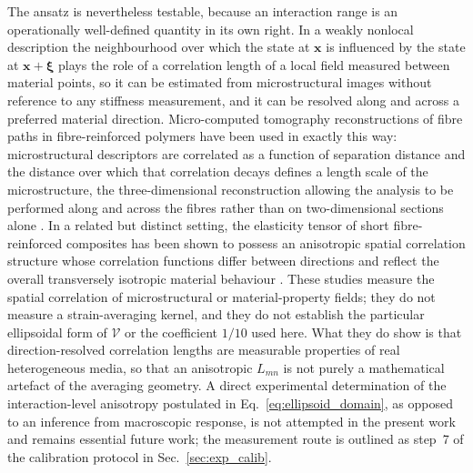 \documentclass[final,3p,times,fleqn]{elsarticle}
\newcommand{\revtwo}[1]{\textcolor{revtwocolor}{#1}}
\begin{document}
\revtwo{The ansatz is nevertheless testable, because an interaction
range is an operationally well-defined quantity in its own right. In a
weakly nonlocal description the neighbourhood over which the state at
$\mathbf{x}$ is influenced by the state at $\mathbf{x}+\boldsymbol{\xi}$
plays the role of a correlation length of a local field measured between
material points, so it can be estimated from microstructural images
without reference to any stiffness measurement, and it can be resolved
along and across a preferred material direction. Micro-computed
tomography reconstructions of fibre paths in fibre-reinforced polymers
have been used in exactly this way: microstructural descriptors are
correlated as a function of separation distance and the distance over
which that correlation decays defines a length scale of the
microstructure, the three-dimensional reconstruction allowing the
analysis to be performed along and across the fibres rather than on
two-dimensional sections alone \cite{Schey2019,ScheyStapleton2022}. In a
related but distinct setting, the elasticity tensor of short
fibre-reinforced composites has been shown to possess an anisotropic
spatial correlation structure whose correlation functions differ between
directions and reflect the overall transversely isotropic material
behaviour \cite{RauterLammering2020}. These studies measure the spatial
correlation of microstructural or material-property fields; they do not
measure a strain-averaging kernel, and they do not establish the
particular ellipsoidal form of $\mathcal{V}$ or the coefficient $1/10$
used here. What they do show is that direction-resolved correlation
lengths are measurable properties of real heterogeneous media, so that
an anisotropic $L_{mn}$ is not purely a mathematical artefact of the
averaging geometry. A direct experimental determination of the
interaction-level anisotropy postulated in Eq.~\eqref{eq:ellipsoid_domain},
as opposed to an inference from macroscopic response, is not attempted in
the present work and remains essential future work; the measurement
route is outlined as step~7 of the calibration protocol in
Sec.~\ref{sec:exp_calib}.}
\end{document}
